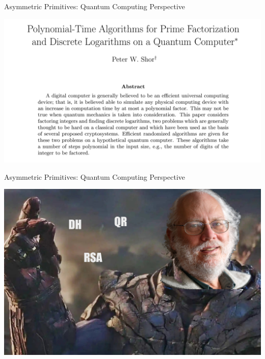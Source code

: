 \documentclass[xcolor=table,10pt,aspectratio=169]{beamer}
\begin{document}
\begin{frame}[label={sec:org08c0987}]{Asymmetric Primitives: Quantum Computing Perspective}
\begin{center}
\includegraphics[width=.9\linewidth]{./shor.png}
\end{center}
\end{frame}

\begin{frame}[label={sec:org29b8672}]{Asymmetric Primitives: Quantum Computing Perspective}
\begin{center}
\includegraphics[keepaspectratio,width=.9\linewidth,height=.9\textheight]{./shor-2.jpeg}
\end{center}
\end{frame}
\end{document}
